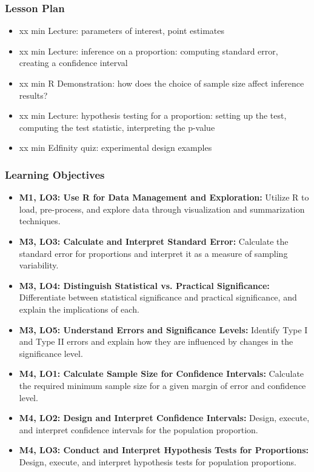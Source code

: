 \begin{frame}
    \frametitle{Lesson Plan}
    \begin{itemize}
        \item xx min Lecture: parameters of interest, point estimates
        \item xx min Lecture: inference on a proportion: computing standard error, creating a confidence interval
        \item xx min R Demonstration: how does the choice of sample size affect inference results?
        \item xx min Lecture: hypothesis testing for a proportion: setting up the test, computing the test statistic, interpreting the p-value
        \item xx min Edfinity quiz: experimental design examples
    \end{itemize}
\end{frame}
            
\begin{frame}
    \frametitle{Learning Objectives}
    \begin{itemize}
        \item \textbf{M1, LO3: Use R for Data Management and Exploration:} Utilize R to load, pre-process, and explore data through visualization and summarization techniques.
        \item \textbf{M3, LO3: Calculate and Interpret Standard Error:} Calculate the standard error for proportions and interpret it as a measure of sampling variability.
        \item \textbf{M3, LO4: Distinguish Statistical vs. Practical Significance:} Differentiate between statistical significance and practical significance, and explain the implications of each.
        \item \textbf{M3, LO5: Understand Errors and Significance Levels:} Identify Type I and Type II errors and explain how they are influenced by changes in the significance level.
        \item \textbf{M4, LO1: Calculate Sample Size for Confidence Intervals:} Calculate the required minimum sample size for a given margin of error and confidence level.
        \item \textbf{M4, LO2: Design and Interpret Confidence Intervals:} Design, execute, and interpret confidence intervals for the population proportion.
        \item \textbf{M4, LO3: Conduct and Interpret Hypothesis Tests for Proportions:} Design, execute, and interpret hypothesis tests for population proportions.
    \end{itemize}
\end{frame}
    
